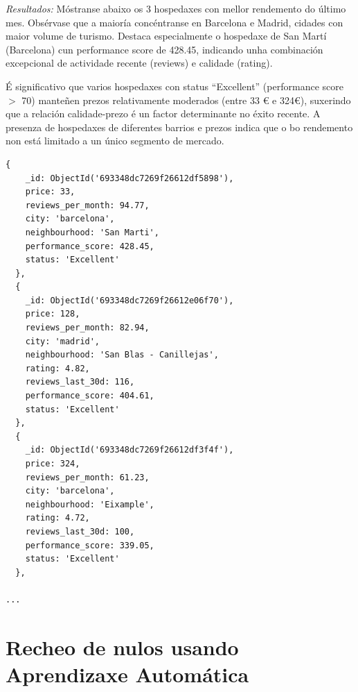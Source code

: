 \documentclass[12pt,a4paper]{article}
\begin{document}
\emph{Resultados:} Móstranse abaixo os 3 hospedaxes con mellor rendemento do último mes. Obsérvase que a maioría concéntranse en Barcelona e Madrid, cidades con maior volume de turismo. Destaca especialmente o hospedaxe de San Martí (Barcelona) cun performance score de 428.45, indicando unha combinación excepcional de actividade recente (reviews) e calidade (rating). 

É significativo que varios hospedaxes con status ``Excellent'' (performance score $>$ 70) manteñen prezos relativamente moderados (entre 33 € e 324€), suxerindo que a relación calidade-prezo é un factor determinante no éxito recente. A presenza de hospedaxes de diferentes barrios e prezos indica que o bo rendemento non está limitado a un único segmento de mercado.

\begin{lstlisting}[style=terminal]
  {
    _id: ObjectId('693348dc7269f26612df5898'),
    price: 33,
    reviews_per_month: 94.77,
    city: 'barcelona',
    neighbourhood: 'San Marti',
    performance_score: 428.45,
    status: 'Excellent'
  },
  {
    _id: ObjectId('693348dc7269f26612e06f70'),
    price: 128,
    reviews_per_month: 82.94,
    city: 'madrid',
    neighbourhood: 'San Blas - Canillejas',
    rating: 4.82,
    reviews_last_30d: 116,
    performance_score: 404.61,
    status: 'Excellent'
  },
  {
    _id: ObjectId('693348dc7269f26612df3f4f'),
    price: 324,
    reviews_per_month: 61.23,
    city: 'barcelona',
    neighbourhood: 'Eixample',
    rating: 4.72,
    reviews_last_30d: 100,
    performance_score: 339.05,
    status: 'Excellent'
  },

...
\end{lstlisting}


\section{Recheo de nulos usando Aprendizaxe Automática}
\label{sec:nulosAA}
\end{document}
